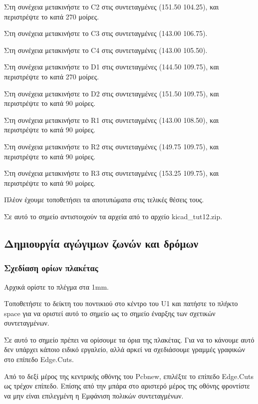 \documentclass[a4paper]{article}
\begin{document}

Στη συνέχεια μετακινήστε το C2 στις συντεταγμένες (151.50 104.25), και περιστρέψτε το κατά 270 μοίρες. 

Στη συνέχεια μετακινήστε το C3 στις συντεταγμένες (143.00 106.75).

Στη συνέχεια μετακινήστε το C4 στις συντεταγμένες (143.00 105.50).

Στη συνέχεια μετακινήστε το D1 στις συντεταγμένες (144.50 109.75), και περιστρέψτε το κατά 270 μοίρες. 

Στη συνέχεια μετακινήστε το D2 στις συντεταγμένες (151.50 109.75), και περιστρέψτε το κατά  90 μοίρες. 

Στη συνέχεια μετακινήστε το R1 στις συντεταγμένες (143.00 108.50), και περιστρέψτε το κατά  90 μοίρες. 

Στη συνέχεια μετακινήστε το R2 στις συντεταγμένες (149.75 109.75), και περιστρέψτε το κατά  90 μοίρες. 

Στη συνέχεια μετακινήστε το R3 στις συντεταγμένες (153.25 109.75), και περιστρέψτε το κατά  90 μοίρες. 

Πλέον έχουμε τοποθετήσει τα αποτυπώματα στις τελικές θέσεις τους.
 
Σε αυτό το σημείο αντιστοιχούν τα αρχεία από το αρχείο kicad\_tut12.zip.

\subsection{Δημιουργία αγώγιμων ζωνών και δρόμων}

\subsubsection{Σχεδίαση ορίων πλακέτας}
Αρχικά ορίστε το πλέγμα στα 1mm.

Τοποθετήστε το δείκτη του ποντικιού στο κέντρο του U1 και πατήστε το πλήκτο space για να οριστεί αυτό το σημείο ως το σημείο έναρξης των σχετικών συντεταγμένων.

Σε αυτό το σημείο πρέπει να ορίσουμε τα όρια της πλακέτας. Για να το κάνουμε αυτό δεν υπάρχει κάποιο ειδικό εργαλείο, αλλά αρκεί να σχεδιάσουμε γραμμές γραφικών στο επίπεδο Edge.Cuts.

Από το δεξί μέρος της κεντρικής οθόνης του \textenglish{Pcbnew}, επιλέξτε το επίπεδο Edge.Cuts ως τρέχον επίπεδο. Επίσης από την μπάρα στο αριστερό μέρος της οθόνης φροντίστε να μην είναι επιλεγμένη η Εμφάνιση πολικών συντεταγμένων. %
\end{document}
